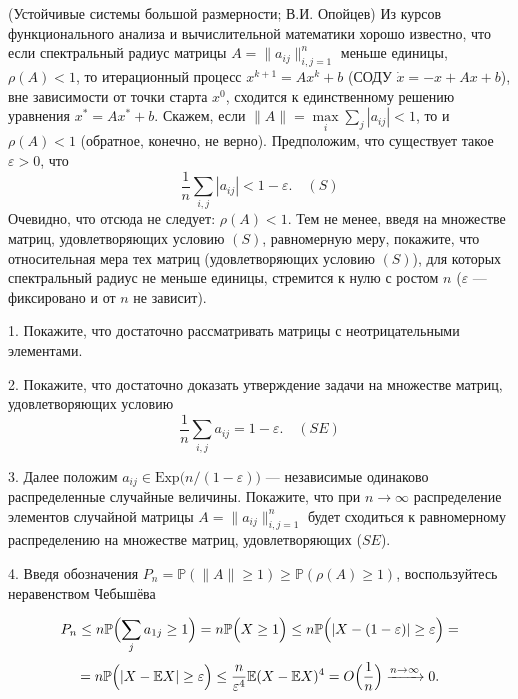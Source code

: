 \begin{problem}(Устойчивые системы большой размерности; В.И. Опойцев)
Из курсов функционального анализа и вычислительной математики хорошо известно, что если спектральный радиус матрицы 
$A=\| a_{ij}\|_{i,j=1}^{n}$ меньше единицы, $\rho(A)<1$, то итерационный процесс $x^{k+1}=A x^k + b$ 
(СОДУ $\dot{x}=-x+A x+ b$), вне зависимости от точки старта $x^0$, 
сходится к единственному решению уравнения $x^*=Ax^*+ b$. 
Скажем, если $\| A\|=\max\limits_{i} \sum\limits_j |a_{ij}|<1$, то и $\rho(A)<1$ (обратное, конечно, не верно). Предположим, что 
существует такое $\varepsilon>0$, что 
$$
\frac{1}{n}\sum\limits_{i,j} |a_{ij}|<1-\varepsilon . 
\quad (S)
$$
Очевидно, что отсюда не следует: $\rho(A)<1$. 
Тем не менее, введя на множестве матриц, удовлетворяющих условию $(S)$, равномерную меру, покажите, что относительная мера тех матриц 
(удовлетворяющих условию $(S)$), для которых спектральный радиус не меньше единицы, стремится к нулю 
с ростом $n$ ($\varepsilon$ --- фиксировано и от $n$ не зависит). 
\end{problem}
\begin{ordre}

1. Покажите, что  достаточно рассматривать матрицы с неотрицательными элементами. 

2.  Покажите, что достаточно доказать утверждение задачи на множестве матриц, удовлетворяющих условию 
$$
\frac{1}{n}\sum\limits_{i,j} a_{ij}=1-\varepsilon . 
\quad (SE)
$$

3. Далее положим $a_{ij}\in \mathrm{Exp} \bigl( n/(1-\varepsilon)\bigr)$ --- независимые одинаково распределенные случайные величины. Покажите, что при $n\to\infty$ распределение элементов случайной матрицы $A=\| a_{ij}\|_{i,j=1}^n$ 
будет сходиться к равномерному распределению на множестве матриц, удовлетворяющих ($SE$). 

4. Введя обозначения
$P_n={\mathbb P}(\| A\|\ge 1)\ge {\mathbb P}(\rho(A)\ge 1)$, воспользуйтесь неравенством Чебышёва

$$
P_n\le n {\mathbb P}\Bigl( \sum\limits_j a_{1j}\ge 1 \Bigr)=n {\mathbb P}\Bigl( X\ge 1 \Bigr)\le 
n {\mathbb P}\Bigl( |X-(1-\varepsilon)|\ge \varepsilon \Bigr)=
$$
$$
=n {\mathbb P}\Bigl( |X-{\mathbb E}X|\ge \varepsilon \Bigr)\le \frac{n}{\varepsilon^4} {\mathbb E}(X-{\mathbb E}X)^4=
O\Bigl(\frac{1}{n}\Bigr) \xrightarrow{n\to\infty} 0 . 
$$
\end{ordre}




